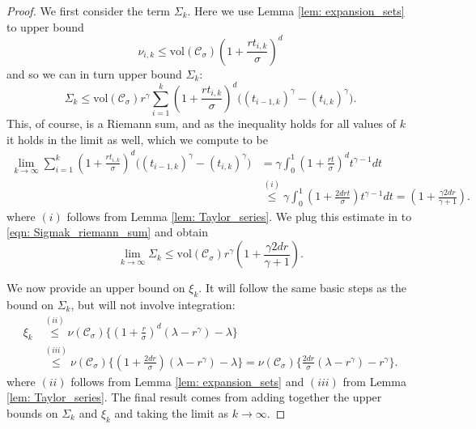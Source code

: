 \documentclass{article}
\newcommand{\vol}{\mathrm{vol}}
\newcommand{\1}{\mathbf{1}}
\newcommand{\Cset}{\mathcal{C}}
\newcommand{\Csig}{\Cset_{\sigma}}
\theoremstyle{aldenthm}
\begin{document}
\begin{proof}
	We first consider the term $\Sigma_k$. Here we use Lemma \ref{lem: expansion_sets} to upper bound
	\begin{equation*}
	\nu_{i,k} \leq \vol(\Csig)\left(1 + \frac{rt_{i,k}}{\sigma}\right)^d
	\end{equation*}
	and so we can in turn upper bound $\Sigma_k$:
	\begin{equation}
	\label{eqn: Sigmak_riemann_sum}
	\Sigma_k \leq \vol(\Csig) r^\gamma \sum_{i = 1}^{k} \left(1 + \frac{rt_{i,k}}{\sigma}\right)^d \biggl( (t_{i-1,k})^{\gamma} - (t_{i,k})^{\gamma}\biggr).
	\end{equation}
	This, of course, is a Riemann sum, and as the inequality holds for all values of $k$ it holds in the limit as well, which we compute to be
	\begin{align*}
	\lim_{k \to \infty} \sum_{i = 1}^{k} \left(1 + \frac{rt_{i,k}}{\sigma}\right)^d \biggl( (t_{i-1,k})^{\gamma} - (t_{i,k})^{\gamma}\biggr) & = \gamma \int_{0}^{1} \left(1 + \frac{rt}{\sigma}\right)^d t^{\gamma - 1} dt \\
	& \overset{(i)}{\leq} \gamma \int_{0}^{1} \left(1 + \frac{2drt}{\sigma}\right) t^{\gamma - 1} dt = \left(1 + \frac{\gamma 2dr}{\gamma + 1}\right).
	\end{align*}
	where $(i)$ follows from Lemma \ref{lem: Taylor_series}. 
	We plug this estimate in to \eqref{eqn: Sigmak_riemann_sum} and obtain
	\begin{equation*}
	\lim_{k \to \infty} \Sigma_k \leq \vol(\Csig) r^{\gamma} \left(1 + \frac{\gamma 2dr}{\gamma + 1}\right).
	\end{equation*}
	
	We now provide an upper bound on $\xi_k$. It will follow the same basic steps as the bound on $\Sigma_k$, but will not involve integration:
	\begin{align*}
	\xi_k & \overset{(ii)}{\leq} \nu(\Csig) \biggl\{ \left(1 + \frac{r}{\sigma}\right)^d(\lambda - r^{\gamma}) - \lambda \biggr\} \\
	& \overset{(iii)}{\leq} \nu(\Csig) \biggl\{ \left(1 + \frac{2dr}{\sigma}\right)(\lambda - r^{\gamma}) - \lambda \biggr\} = \nu(\Csig) \biggl\{ \frac{2dr}{\sigma}(\lambda - r^{\gamma}) - r^{\gamma} \biggr\}.
	\end{align*}
	where $(ii)$ follows from Lemma \ref{lem: expansion_sets} and $(iii)$ from Lemma \ref{lem: Taylor_series}. The final result comes from adding together the upper bounds on $\Sigma_k$ and $\xi_k$ and taking the limit as $k \to \infty$.
\end{proof}
\end{document}

